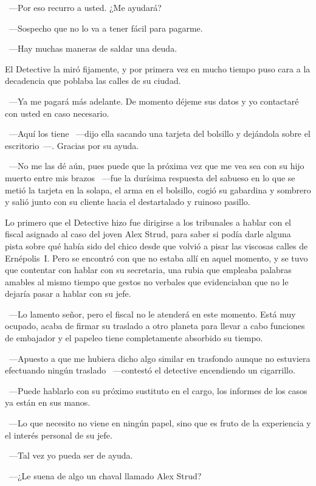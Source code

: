 ~---Por eso recurro a usted. ¿Me ayudará?

~---Sospecho que no lo va a tener fácil para pagarme.

~---Hay muchas maneras de saldar una deuda.

El Detective la miró fijamente, y por primera vez en mucho tiempo puso cara a la decadencia que poblaba las calles de su ciudad.

~---Ya me pagará más adelante. De momento déjeme sus datos y yo contactaré con usted en caso necesario.

~---Aquí los tiene ~---dijo ella sacando una tarjeta del bolsillo y dejándola sobre el escritorio~---. Gracias por su ayuda.

~---No me las dé aún, pues puede que la próxima vez que me vea sea con su hijo muerto entre mis brazos ~---fue la durísima respuesta del sabueso en lo que se metió la tarjeta en la solapa, el arma en el bolsillo, cogió su gabardina y sombrero y salió junto con su cliente hacia el destartalado y ruinoso pasillo.

\parbreak
Lo primero que el Detective hizo fue dirigirse a los tribunales a hablar con el fiscal asignado al caso del joven Alex Strud, para saber si podía darle alguna pista sobre qué había sido del chico desde que volvió a pisar las viscosas calles de Ernépolis~I. Pero se encontró con que no estaba allí en aquel momento, y se tuvo que contentar con hablar con su secretaria, una rubia que empleaba palabras amables al mismo tiempo que gestos no verbales que evidenciaban que no le dejaría pasar a hablar con su jefe.

~---Lo lamento señor, pero el fiscal no le atenderá en este momento. Está muy ocupado, acaba de firmar su traslado a otro planeta para llevar a cabo funciones de embajador y el papeleo tiene completamente absorbido su tiempo.

~---Apuesto a que me hubiera dicho algo similar en trasfondo aunque no estuviera efectuando ningún traslado ~---contestó el detective encendiendo un cigarrillo.

~---Puede hablarlo con su próximo sustituto en el cargo, los informes de los casos ya están en sus manos.

~---Lo que necesito no viene en ningún papel, sino que es fruto de la experiencia y el interés personal de su jefe.

~---Tal vez yo pueda ser de ayuda.

~---¿Le suena de algo un chaval llamado Alex Strud?

